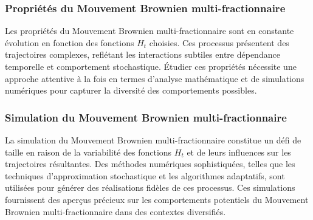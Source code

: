 \subsubsection{Propriétés du Mouvement Brownien multi-fractionnaire}

Les propriétés du Mouvement Brownien multi-fractionnaire sont en constante évolution en fonction des fonctions $H_t$ choisies. Ces processus présentent des trajectoires complexes, reflétant les interactions subtiles entre dépendance temporelle et comportement stochastique. Étudier ces propriétés nécessite une approche attentive à la fois en termes d'analyse mathématique et de simulations numériques pour capturer la diversité des comportements possibles.

\subsubsection{Simulation du Mouvement Brownien multi-fractionnaire}

La simulation du Mouvement Brownien multi-fractionnaire constitue un défi de taille en raison de la variabilité des fonctions $H_t$ et de leurs influences sur les trajectoires résultantes. Des méthodes numériques sophistiquées, telles que les techniques d'approximation stochastique et les algorithmes adaptatifs, sont utilisées pour générer des réalisations fidèles de ces processus. Ces simulations fournissent des aperçus précieux sur les comportements potentiels du Mouvement Brownien multi-fractionnaire dans des contextes diversifiés.
